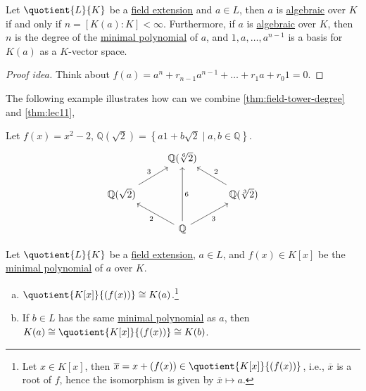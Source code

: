 \begin{theorem}\label{thm:lec11}
	Let \(\quotient{L}{K} \) be a \hyperref[def:field-extension]{field extension} and \(a\in L\), then \(a\) is \hyperref[def:algebraic]{algebraic} over \(K\) if and only if \(n = [K(a) \colon K] < \infty \). Furthermore, if \(a\) is \hyperref[def:algebraic]{algebraic} over \(K\), then \(n\) is the degree of the \hyperref[def:minimal-polynomial]{minimal polynomial} of \(a\), and \(1, a, \dots , a^{n-1}\) is a basis for \(K(a)\) as a \(K\)-vector space.
\end{theorem}
\begin{proof}[Proof idea]
	Think about \(f(a) = a^n + r_{n-1} a^{n-1} + \dots + r_1 a + r_0 1 = 0\).
\end{proof}

The following example illustrates how can we combine \autoref{thm:field-tower-degree} and \autoref{thm:lec11},

\begin{eg}
	Let \(f(x) = x^2 - 2\), \(\mathbb{Q} (\sqrt{2} ) = \left\{ a1+b\sqrt{2} \mid a, b\in \mathbb{Q} \right\} \).
	\[
		\begin{tikzcd}
			& {\mathbb{Q}(\sqrt[6]{2})} \\
			{\mathbb{Q}(\sqrt{2})} && {\mathbb{Q}(\sqrt[3]{2})} \\
			& {\mathbb{Q}}
			\arrow["3"', from=3-2, to=2-3]
			\arrow["2"', from=2-3, to=1-2]
			\arrow["6"', from=3-2, to=1-2]
			\arrow["2", from=3-2, to=2-1]
			\arrow["3", from=2-1, to=1-2]
		\end{tikzcd}
	\]
\end{eg}

\begin{theorem}\label{thm:field-isomorphism}
	Let \(\quotient{L}{K} \) be a \hyperref[def:field-extension]{field extension}, \(a\in L\), and \(f(x)\in K[x]\) be the \hyperref[def:minimal-polynomial]{minimal polynomial} of \(a\) over \(K\).
	\begin{enumerate}[(a)]
		\item \(\quotient{K[x]}{(f(x))} \cong K(a)\).\footnote{Let \(x\in K[x]\), then \(\overline{x} = x+(f(x))\in \quotient{K[x]}{(f(x))} \), i.e., \(\overline{x} \) is a root of \(f\), hence the isomorphism is given by \(\overline{x} \mapsto a\).}
		\item If \(b\in L\) has the same \hyperref[def:minimal-polynomial]{minimal polynomial} as \(a\), then \(K(a) \cong \quotient{K[x]}{(f(x))} \cong K(b)\).
	\end{enumerate}
\end{theorem}

